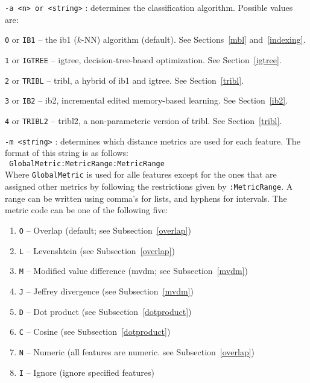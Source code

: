 \documentclass{report}
\begin{document}
\begin{description}

\item {\tt -a <n> or <string>} : determines the classification
algorithm. Possible values are:

	\begin{description}
	\item {\tt 0} or {\tt IB1} -- the {\sc ib1} ($k$-NN) algorithm (default). See Sections~\ref{mbl} and~\ref{indexing}.
	\item {\tt 1} or {\tt IGTREE} -- {\sc igtree}, decision-tree-based optimization. See Section~\ref{igtree}.
	\item {\tt 2} or {\tt TRIBL} -- {\sc tribl}, a hybrid of {\sc ib1} and {\sc igtree}. See Section~\ref{tribl}.
	\item {\tt 3} or {\tt IB2} -- {\sc ib2}, incremental edited memory-based learning. See Section~\ref{ib2}.
	\item {\tt 4} or {\tt TRIBL2} -- {\sc tribl2}, a non-parameteric version of {\sc tribl}. See Section~\ref{tribl}.
	\end{description}

\item {\tt -m <string>} : determines which distance metrics are used
for each feature. The format of this string is as follows:\\ {\tt
GlobalMetric:MetricRange:MetricRange}\\ Where {\tt GlobalMetric} is
used for alle features except for the ones that are assigned other
metrics by following the restrictions given by {\tt :MetricRange}.  A
range can be written using comma's for lists, and hyphens for
intervals. The metric code can be one of the following five:

\begin{enumerate}
\item {\tt O} -- Overlap (default; see Subsection~\ref{overlap})
\item {\tt L} -- Levenshtein (see Subsection~\ref{overlap})
\item {\tt M} -- Modified value difference ({\sc mvdm}; see Subsection~\ref{mvdm})
\item {\tt J} -- Jeffrey divergence (see Subsection~\ref{mvdm})
\item {\tt D} -- Dot product (see Subsection~\ref{dotproduct})
\item {\tt C} -- Cosine (see Subsection~\ref{dotproduct})
\item {\tt N} -- Numeric (all features are numeric. see Subsection~\ref{overlap})
\item {\tt I} -- Ignore (ignore specified features)
\end{enumerate}


\end{description}
\end{document}
